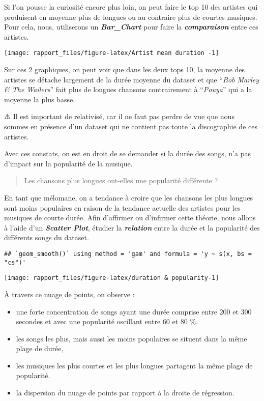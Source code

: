 \documentclass[
]{article}
\providecommand{\tightlist}{%
  \setlength{\itemsep}{0pt}\setlength{\parskip}{0pt}}
\begin{document}
Si l'on pousse la curiosité encore plus loin, on peut faire le top 10
des artistes qui produisent en moyenne plus de longues ou au contraire
plus de courtes musiques. Pour cela, nous, utiliserons un
\textbf{\emph{Bar\_Chart}} pour faire la \textbf{\emph{comparaison}}
entre ces artistes.

\begin{center}\texttt{[image: rapport\_files/figure-latex/Artist mean duration -1]} \end{center}

Sur ces 2 graphiques, on peut voir que dans les deux tops 10, la moyenne
des artistes se détache largement de la durée moyenne du dataset et que
``\emph{Bob Marley \& The Wailers}'' fait plus de longues chansons
contrairement à ``\emph{Pouya}'' qui a la moyenne la plus basse.

⚠️ Il est important de relativisé, car il ne faut pas perdre de vue que
nous sommes en présence d'un dataset qui ne contient pas toute la
discographie de ces artistes.

Avec ces constats, on est en droit de se demander si la durée des songs,
n'a pas d'impact sur la popularité de la musique.

\begin{quote}
Les chansons plus longues ont-elles une popularité différente ?
\end{quote}

En tant que mélomane, on a tendance à croire que les chansons les plus
longues sont moins populaires en raison de la tendance actuelle des
artistes pour les musiques de courte durée. Afin d'affirmer ou
d'infirmer cette théorie, nous allons à l'aide d'un
\textbf{\emph{Scatter Plot}}, étudier la \textbf{\emph{relation}} entre
la durée et la popularité des différents songs du dataset.

\begin{verbatim}
## `geom_smooth()` using method = 'gam' and formula = 'y ~ s(x, bs = "cs")'
\end{verbatim}

\begin{center}\texttt{[image: rapport\_files/figure-latex/duration \& popularity-1]} \end{center}

À travers ce nuage de points, on observe :

\begin{itemize}
\tightlist
\item
  une forte concentration de songs ayant une durée comprise entre 200 et
  300 secondes et avec une popularité oscillant entre 60 et 80 \%.
\item
  les songs les plus, mais aussi les moins populaires se situent dans la
  même plage de durée,
\item
  les musiques les plus courtes et les plus longues partagent la même
  plage de popularité.
\item
  la dispersion du nuage de points par rapport à la droite de
  régression.
\end{itemize}
\end{document}
